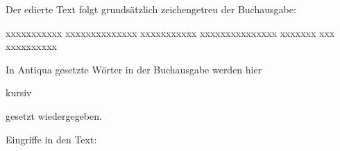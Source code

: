 

Der edierte Text folgt grundsätzlich zeichengetreu der Buchausgabe:

xxxxxxxxxxx xxxxxxxxxxxxxx xxxxxxxxxxx xxxxxxxxxxxxxxx xxxxxxx
xxx xxxxxxxxxx

In Antiqua gesetzte Wörter in der
Buchausgabe werden hier \begin{it}kursiv\end{it} gesetzt wiedergegeben.

Eingriffe in den Text:

\theendnotes
